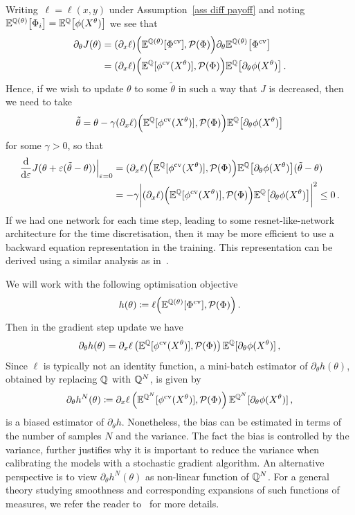 Writing~$\ell = \ell(x,y)$ under Assumption~\ref{ass diff payoff} and noting~${\mathbb{E}^{\mathbb{Q}(\theta)} \big[ \Phi_i \big] = \mathbb{E}^{\mathbb{Q}} \big[ \phi(X^\theta) \big]}$ we see that
\[
\begin{split}
\partial_\theta J(\theta) & =  (\partial_x \ell)\Big(\mathbb{E}^{\mathbb{Q}(\theta)}[\Phi^{\textup{cv}}], \mathcal{P}(\Phi) \Big) \partial_\theta \mathbb{E}^{\mathbb{Q}(\theta)} \big[ \Phi^{\textup{cv}} \big] \\
& =  (\partial_x \ell)\Big(\mathbb{E}^{\mathbb{Q}}[\phi^{\textup{cv}}(X^\theta)], \mathcal{P}(\Phi) \Big) \mathbb{E}^{\mathbb{Q}} \big[ \partial_\theta \phi(X^\theta) \big]\,. 	
\end{split}
\]
Hence, if we wish to update $\theta$ to some $\tilde \theta$ in such a way that $J$ is decreased, then we need to take 
\[
\tilde \theta = \theta - \gamma  (\partial_x \ell)\Big(\mathbb{E}^{\mathbb{Q}}[\phi^{\textup{cv}}(X^\theta)], \mathcal{P}(\Phi) \Big) \mathbb{E}^{\mathbb{Q}} \big[ \partial_\theta \phi(X^\theta) \big] 
\]
for some $\gamma > 0$, so that
\[
\begin{split}
\frac{\mathrm{d}}{\mathrm{d}\varepsilon} J(\theta + \varepsilon (\tilde \theta - \theta)) \Big \rvert_{\varepsilon=0} 
 & = (\partial_x \ell)\Big(\mathbb{E}^{\mathbb{Q}}[\phi^{\textup{cv}}(X^\theta)], \mathcal{P}(\Phi) \Big) \mathbb{E}^{\mathbb{Q}} \big[ \partial_\theta \phi(X^\theta) \big](\tilde \theta - \theta)\\
& = - \gamma \bigg|  (\partial_x \ell)\Big(\mathbb{E}^{\mathbb{Q}}[\phi^{\textup{cv}}(X^\theta)], \mathcal{P}(\Phi) \Big) \mathbb{E}^{\mathbb{Q}} \big[ \partial_\theta \phi(X^\theta) \big]\bigg|^2 \leq 0\,.
\end{split}
\]
If we had one network for each time step, leading to some resnet-like-network architecture for the time discretisation, then it may be more efficient to use a backward equation representation in the training. 
This representation can be derived using a similar analysis as in~\cite{Jabir2019Mean-FieldControl, Siska2020GradientProblems}. 

We will work with the following optimisation objective
\[
h(\theta) \coloneqq  \ell\Big(\mathbb{E}^{\mathbb{Q}(\theta)}[\Phi^{\textup{cv}}], \mathcal{P}(\Phi)\Big)\,.	
\]
Then in the gradient step update we have 
\[
\partial_{\theta}h(\theta) =  \partial_x \ell\left(\mathbb{E}^{\mathbb{Q}}[\phi^{\textup{cv}}(X^{\theta})],\mathcal{P}(\Phi) \right) \mathbb{E}^{\mathbb{Q}}[\partial_\theta \phi(X^{\theta})]\,,
\]
Since $\ell$ is typically not an identity function, a mini-batch estimator of 
$\partial_{\theta}h(\theta)$, obtained by replacing $\mathbb{Q}$ with $\mathbb{Q}^N$, is given by
\[
\partial_{\theta}h^{N}(\theta) \coloneqq   \partial_x \ell\left(\mathbb{E}^{\mathbb{Q}^N}[\phi^{\textup{cv}}(X^{\theta})],\mathcal{P}(\Phi) \right) \mathbb{E}^{\mathbb{Q}^N}[\partial_\theta \phi(X^{\theta})]\,,
\]
is a biased estimator of $\partial_{\theta}h$. Nonetheless, the bias can be estimated in terms of the number of samples $N$ and the variance. The fact the bias is controlled by the variance, further justifies why it is important to reduce the variance when calibrating the models with a stochastic gradient algorithm. 
An alternative perspective is to view $\partial_{\theta}h^{N}(\theta) $ as non-linear function of $\mathbb{Q}^N$. For a general theory studying smoothness and corresponding expansions of such functions of measures, we refer the reader to~\cite{Chassagneux2022WeakMeasures} for more details. 

